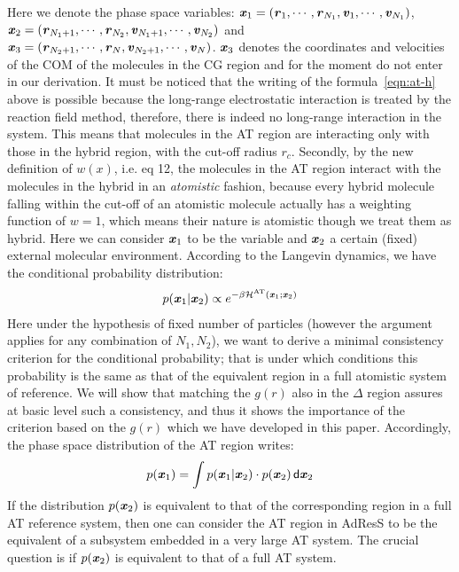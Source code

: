 \documentclass[aps,prb,preprint,citeautoscript]{revtex4}
\newcommand{\redc}[1]{{\color{black} #1}}
\renewcommand{\v}[1]{\textbf{\textit{#1}}}
\renewcommand{\d}[1]{\textsf{#1}}
\begin{document}
Here we denote the phase space variables: $\v x_1 = (\v r_1, \cdots, \v
r_{N_1}, \v v_1, \cdots, \v v_{N_1})$,  $\v x_2 = (\v r_{N_1+1},
\cdots, \v r_{N_2}, \v v_{N_1+1}, \cdots, \v v_{N_2})$ and
$\v x_3 = (\v r_{N_2+1},
\cdots, \v r_{N}, \v v_{N_2+1}, \cdots, \v v_{N})$. $\v x_{3}$ denotes the coordinates and velocities of the COM of the molecules in the CG region and for the moment do not enter in our derivation.
\redc{It must be noticed that the writing of the formula~\eqref{eqn:at-h} above is possible because the long-range electrostatic interaction is treated by the reaction
field method, therefore, there is indeed no long-range interaction in
the system. This means that molecules in the AT region are interacting only with those in the hybrid
region, with the cut-off radius $r_c$. Secondly, by the new
definition of $w(x)$, i.e. eq 12, the molecules in the AT
region interact with the molecules in the hybrid in an 
\emph{atomistic} fashion, because every hybrid molecule falling within the cut-off of
an atomistic molecule actually has a weighting function of $w=1$,
which means their nature is atomistic though we treat them as hybrid.}
Here we can consider $\v x_1$ to be the variable and $\v x_2$ a certain (fixed) external molecular environment. 
According to the Langevin dynamics, we have the conditional probability distribution:
\begin{align}
  p (\v x_1 \vert \v x_2)  \propto
  e^{-\beta \mathcal H^{\textrm{AT}}(\v x_1; \v x_2)}
\end{align}
\redc{Here under the hypothesis of fixed number of particles (however the argument applies for any combination of $N_{1},N_{2}$), we want to derive a minimal consistency criterion for the conditional probability; that is under which conditions this probability is the same as that of the equivalent region in a full atomistic system of reference. We will show that matching the $g(r)$ also in the $\Delta$ region assures at basic level such a consistency, and thus it shows the importance of the criterion based on the $g(r)$ which we have developed in this paper.}
Accordingly, the phase space distribution of the AT region writes:
\begin{align}
  p(\v x_1) = \int p(\v x_1\vert\v x_2)\cdot p (\v x_2) \,\d d\v x_2
\end{align}
If the distribution $p(\v x_2)$ is equivalent to that of the corresponding region in a full AT reference system, then one can consider the AT region in AdResS to be the equivalent of a subsystem embedded in  a very large AT
system.
The crucial question is if $p(\v x_2)$ is equivalent to that of a full AT system. 
\end{document}

